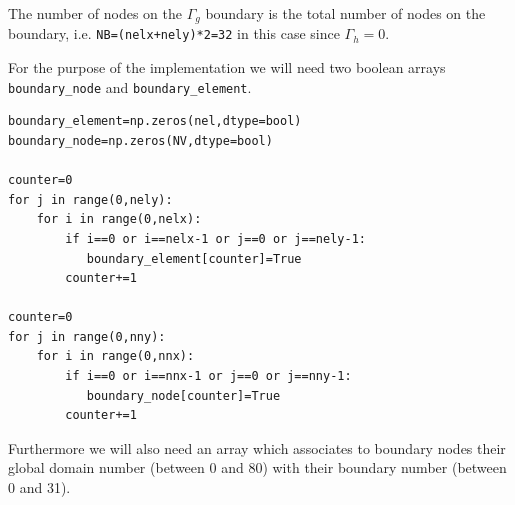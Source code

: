 \begin{center}
\end{center}





The number of nodes on the $\Gamma_g$ boundary is the total
number of nodes on the boundary, i.e. \lstinline{NB=(nelx+nely)*2=32} in this case 
since $\Gamma_h=0$.

For the purpose of the implementation we will need two boolean arrays
\lstinline{boundary_node} and \lstinline{boundary_element}.

\begin{lstlisting}
boundary_element=np.zeros(nel,dtype=bool)  
boundary_node=np.zeros(NV,dtype=bool)  

counter=0
for j in range(0,nely):
    for i in range(0,nelx):
        if i==0 or i==nelx-1 or j==0 or j==nely-1: 
           boundary_element[counter]=True 
        counter+=1

counter=0
for j in range(0,nny):
    for i in range(0,nnx):
        if i==0 or i==nnx-1 or j==0 or j==nny-1: 
           boundary_node[counter]=True 
        counter+=1
\end{lstlisting}

Furthermore we will also need an array which associates to 
boundary nodes their {\color{teal} global domain number} (between 0 and 80)
with their {\color{teal} boundary number} (between 0 and 31).


